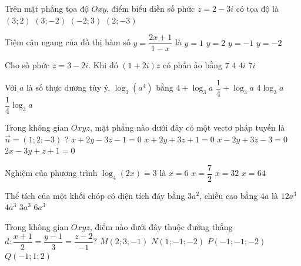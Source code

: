 \begin{ex}%
Trên mặt phẳng tọa độ $Oxy$, điểm biểu diễn số phức $z=2-3 i$ có tọa độ là
\choice
{$(3 ; 2)$}
{$(3 ;-2)$}
{$(-2 ; 3)$}
{\True $(2 ;-3)$}
\end{ex}
\begin{ex}%
Tiệm cận ngang của đồ thị hàm số $y=\dfrac{2 x+1}{1-x}$ là
\choice
{ $y=1$}
{$y=2$}
{$y=-1$}
{\True $y=-2$}
\end{ex}
\begin{ex}%
Cho số phức $z=3-2i$. Khi đó $(1+2i)z$ có phần ảo bằng
\choice
{$7$}
{$4$}
{\True $4i$}
{$7i$}
\end{ex}
\begin{ex}%
Với $a$ là số thực dương tùy ý, $\log _3\left(a^4\right)$ bằng
\choice
{$4+\log _3 a$}
{$\dfrac{1}{4}+\log _3 a$}
{\True $4 \log _3 a$}
{$\dfrac{1}{4} \log _3 a$}
\end{ex}
\begin{ex}%
Trong không gian $Oxyz$, mặt phẳng nào dưới đây có một vectơ pháp tuyến là $\vec{n}=(1 ; 2 ;-3)$ ?
\choice
{\True $x+2y-3z-1=0$}
{$x+2y+3z+1=0$}
{$x-2y+3z-3=0$}
{$2x-3y+z+1=0$}
\end{ex}
\begin{ex}%
Nghiệm của phương trình $\log _4(2 x)=3$ là
\choice
{$x=6$}
{$x=\dfrac{7}{2}$}
{\True $x=32$}
{$x=64$}
\end{ex}
\begin{ex}%
	Thể tích của một khối chóp có diện tích đáy bằng $3a^2$, chiều cao bằng $4a$ là
	\choice
	{ $12 a^3$}
	{\True $4 a^3$}
	{$3 a^3$}
	{$6 a^3$}
\end{ex}
\begin{ex}%
	Trong không gian $O x y z$, điểm nào dưới đây thuộc đường thẳng $d: \dfrac{x+1}{2}=\dfrac{y-1}{3}=\dfrac{z-2}{-1} ?$
	\choice
	{$M(2 ; 3 ;-1)$}
	{$N(1 ;-1 ;-2)$}
	{$P(-1 ;-1 ;-2)$}
	{\True $Q(-1 ; 1 ; 2)$}
\end{ex}
